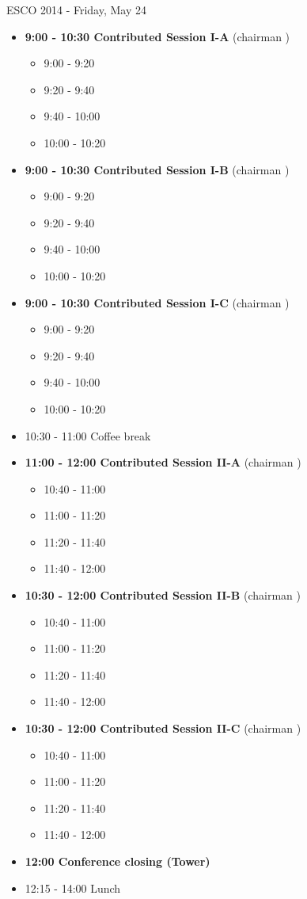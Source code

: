 \documentclass[10pt, A4]{article}
\begin{document}
\centerline{\huge ESCO 2014 - Friday, May 24}
\vspace{4mm}
\begin{itemize}    
\item {\bf 9:00 - 10:30 Contributed Session I-A} (chairman ) 
  \begin{itemize}
    \item 9:00 - 9:20 
    \item 9:20 - 9:40 
    \item 9:40 - 10:00 
    \item 10:00 - 10:20  
  \end{itemize}
  \item {\bf 9:00 - 10:30 Contributed Session I-B} (chairman ) 
  \begin{itemize}
    \item 9:00 - 9:20 
    \item 9:20 - 9:40 
    \item 9:40 - 10:00 
    \item 10:00 - 10:20      
  \end{itemize}
    \item {\bf 9:00 - 10:30 Contributed Session I-C} (chairman ) 
  \begin{itemize}
    \item 9:00 - 9:20 
    \item 9:20 - 9:40 
    \item 9:40 - 10:00 
    \item 10:00 - 10:20      
  \end{itemize}
  \item 10:30 - 11:00 Coffee break
  \item {\bf 11:00 - 12:00 Contributed Session II-A} (chairman ) 
  \begin{itemize}
    \item 10:40 - 11:00 
    \item 11:00 - 11:20 
    \item 11:20 - 11:40 
    \item 11:40 - 12:00 
  \end{itemize}
  \item {\bf 10:30 - 12:00 Contributed Session II-B} (chairman ) 
  \begin{itemize}
    \item 10:40 - 11:00 
    \item 11:00 - 11:20 
    \item 11:20 - 11:40 
    \item 11:40 - 12:00  
  \end{itemize}
  \item {\bf 10:30 - 12:00 Contributed Session II-C} (chairman ) 
  \begin{itemize}
    \item 10:40 - 11:00 
    \item 11:00 - 11:20 
    \item 11:20 - 11:40 
    \item 11:40 - 12:00 
  \end{itemize}
  \item {\bf 12:00 Conference closing (Tower)}
  \item 12:15 - 14:00 Lunch
\newpage
\end{itemize}
\end{document}
